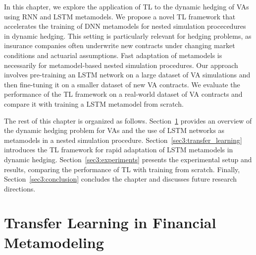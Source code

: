 In this chapter, we explore the application of TL to the dynamic hedging of VAs using RNN and LSTM metamodels.
We propose a novel TL framework that accelerates the training of DNN metamodels for nested simulation procecedures in dynamic hedging.
This setting is particularly relevant for hedging problems, as insurance companies often underwrite new contracts under changing market conditions and actuarial assumptions.
Fast adaptation of metamodels is necessarily for metamodel-based nested simulation procedures.
Our approach involves pre-training an LSTM network on a large dataset of VA simulations and then fine-tuning it on a smaller dataset of new VA contracts.
We evaluate the performance of the TL framework on a real-world dataset of VA contracts and compare it with training a LSTM metamodel from scratch.

The rest of this chapter is organized as follows.
Section~\ref{sec3:background} provides an overview of the dynamic hedging problem for VAs and the use of LSTM networks as metamodels in a nested simulation procedure.
Section~\ref{sec3:transfer_learning} introduces the TL framework for rapid adaptation of LSTM metamodels in dynamic hedging.
Section~\ref{sec3:experiments} presents the experimental setup and results, comparing the performance of TL with training from scratch.
Finally, Section~\ref{sec3:conclusion} concludes the chapter and discusses future research directions.

\section{Transfer Learning in Financial Metamodeling} \label{sec3:background}

